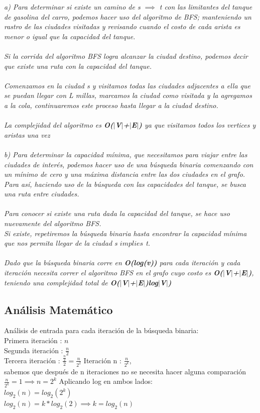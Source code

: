 \documentclass{article}
\begin{document}
\textit{a) Para determinar si existe un camino de s $\implies$ t con las limitantes del tanque de gasolina del carro, podemos hacer uso del algoritmo de BFS; manteniendo un rastro de las ciudades visitadas y revisando cuando el costo de cada arista es menor o igual que la capacidad del tanque.\\\\ Si la corrida del algoritmo BFS logra alcanzar la ciudad destino, podemos decir que existe una ruta con la capacidad del tanque.\\\\ Comenzamos en la ciudad s y visitamos todas las ciudades adjacentes a ella que se puedan llegar con L millas, marcamos la ciudad como visitada y la agregamos a la cola, continuaremos este proceso hasta llegar a la ciudad destino.\\\\ La complejidad del algoritmo es \textbf{O($|$V$|$+$|$E$|$)} ya que visitamos todos los vertices y aristas una vez}\\\\

\textit{b) Para determinar la capacidad mínima, que necesitamos para viajar entre las ciudades de interés, podemos hacer uso de una búsqueda binaria comenzando con un mínimo de cero y una máxima distancia entre las dos ciudades en el grafo. Para así, haciendo uso de la búsqueda con las capacidades del tanque, se busca una ruta entre ciudades.\\\\ Para conocer si existe una ruta dada la capacidad del tanque, se hace uso nuevamente del algoritmo BFS. \\Si existe, repetiremos la búsqueda binaria hasta encontrar la capacidad mínima que nos permita llegar de la ciudad s $implies$ t. \\\\ Dado que la búsqueda binaria corre en \textbf{O(log(v))} para cada iteración y cada iteración necesita correr el algoritmo BFS en el grafo cuyo costo es \textbf{O($|$V$|$+$|$E$|$)}, teniendo una complejidad total de \textbf{O($|$V$|$+$|$E$|$)log$|$V$|$)} }

\subsection{Análisis Matemático}

Análisis de entrada para cada iteración de la búsqueda binaria:\\
Primera iteración : $n$\\
Segunda iteración : $\frac{n}{2}$\\
Tercera iteración : $\frac{\frac{n}{2}}{2} = \frac{n}{2^{2}}$
Iteración n : $\frac{n}{2^{k}}$, \\
sabemos que después de n iteraciones no se necesita hacer alguna comparación $\frac{n}{2^{k}} = 1 \implies n = 2^{k}$ Aplicando log en ambos lados: \\
$log_{2}(n) = log_{2}(2^{k})$\\
$log_{2}(n) = k*log_{2}(2) \implies k = log_{2}(n)$ \\\\
\end{document}
